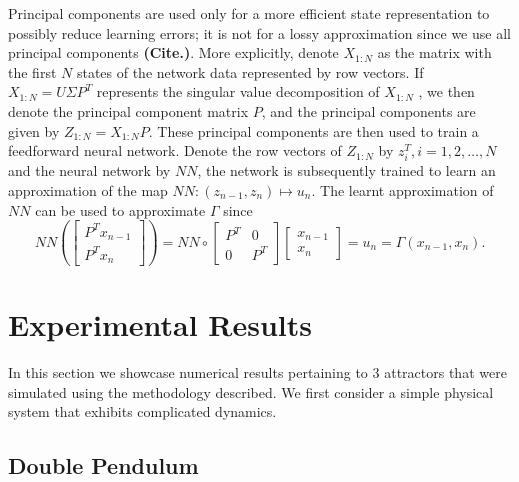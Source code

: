 Principal components are used only for a more efficient state representation to possibly reduce learning errors; it is not for a lossy approximation since we use all principal components \textbf{(Cite.)}.
More explicitly, denote $X_{1:N}$ as the matrix with the first $N$ states of the network data represented by row vectors. If $X_{1:N}=U\Sigma P^T$ represents the singular value decomposition of $X_{1:N}$ , we then denote the principal component matrix $P$, and the principal components are given by 
 $Z_{1:N}=X_{1:N}P$.
These principal components are then used to train a feedforward neural network. Denote the row vectors of $Z_{1:N}$ by 
$z_i^T, i=1,2,\ldots,N$ and the neural network by $NN$, the network is subsequently trained to learn an approximation of the map
$NN: (z_{n-1},z_n) \mapsto  u_n.
$
The learnt approximation of $NN$ can be used to approximate $\Gamma$ since 
\[
NN\left( \begin{bmatrix} 
P^Tx_{n-1} \\
P^Tx_n
\end{bmatrix}
\right) = NN \circ 
\begin{bmatrix}
P^T & 0 \\
0 & P^T 
\end{bmatrix}\begin{bmatrix}
x_{n-1}\\
x_n
\end{bmatrix} = u_n = \Gamma(x_{n-1},x_n).
\]


\section{Experimental Results}
In this section we showcase numerical results pertaining to 3 attractors that were simulated using the methodology described. We first consider a simple physical system that exhibits complicated dynamics.
\subsection{Double Pendulum}

